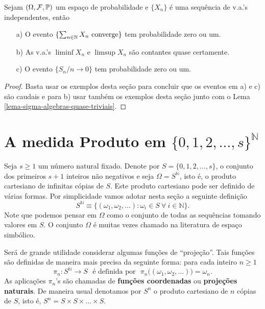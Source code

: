 \begin{corolario}
Sejam $(\Omega,\mathcal{F},\mathbb{P})$ um espaço de probabilidade e 
$\{X_n\}$ é uma sequência de v.a.'s independentes, 
então 
	\begin{itemize}
		\item[a)]
		O evento $\{ \sum_{n\in\mathbb{N}} X_n\ \text{converge}\}$ tem probabilidade
		zero ou um.		
		
		\item[b)]
		As v.a.'s $\liminf X_n$ e $\limsup X_n$ são contantes quase certamente.
		
		\item[c)]
		O evento $\{S_n/n\to 0\}$ tem probabilidade zero ou um.		
		
	\end{itemize}
\end{corolario}


\begin{proof}
Basta usar os exemplos desta seção para concluir que os eventos
em a) e c) são caudais e para b) usar também os exemplos desta
seção  junto com o Lema \ref{lema-sigma-algebras-quase-triviais}. 
\end{proof}



















\section{A medida Produto em $\{0,1,2,\ldots,s\}^{\mathbb{N}}$}

Seja $s\geq 1$ um número natural fixado. 
Denote por $S=\{0,1,2,\ldots,s\}$, 
o conjunto dos primeiros $s+1$ inteiros não negativos 
e seja $\Omega = S^{\mathbb{N}}$, isto é,
o produto cartesiano de infinitas cópias de $S$. 
Este produto cartesiano pode ser definido 
de várias formas. Por simplicidade vamos 
adotar nesta seção a seguinte definição 
\[
S^{\mathbb{N}}
\equiv 
\{
	(\omega_1,\omega_2,\ldots)
	:\omega_i\in S\ \forall \ i\in \mathbb{N}
\}.
\]
Note que podemos pensar em $\Omega$ como 
o conjunto de todas as sequências tomando 
valores em $S$. O conjunto $\Omega$ é 
muitas vezes chamado na literatura de 
espaço simbólico.

Será de grande utilidade considerar algumas
funções de ``projeção''. 
Tais funções são definidas de maneira mais precisa
da seguinte forma: para cada inteiro $n\geq 1$
\[
	\pi_n: S^{\mathbb{N}}\to S
	\ \ \
	\text{é definida por}\ \ \
	\pi_n\big( (\omega_1,\omega_2,\ldots)  \big)
	=
	\omega_n.
\]
As aplicações $\pi_n$'s são chamadas de 
{\bf funções coordenadas} ou {\bf projeções naturais}.
De maneira usual denotamos por $S^n$ o produto cartesiano
de $n$ cópias de $S$, isto é, $S^n=S\times S\times\ldots \times S$.


